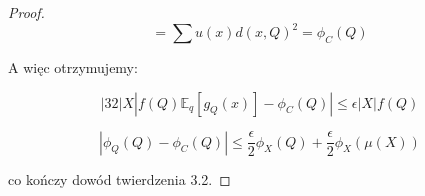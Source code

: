 \begin{proof}
\begin{equation}
    = \sum u(x) d(x, Q)^2 = \phi_{C}(Q)
\end{equation}

\noindent
A więc otrzymujemy:

\begin{equation}
    |32|X|f(Q)\mathbb{E}_q[g_{Q}(x)] - \phi_{C}(Q)| \leq \epsilon|X|f(Q)
\end{equation}

\begin{equation}
    |\phi_{Q}(Q) - \phi_{C}(Q)| \leq \frac{\epsilon}{2}\phi_{X}(Q) + \frac{\epsilon}{2}\phi_{X}(\mu(X))
\end{equation}

\noindent
co kończy dowód twierdzenia 3.2.

\end{proof}